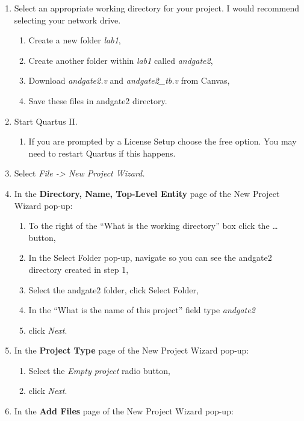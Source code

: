 \begin{enumerate}
\def\labelenumi{\arabic{enumi}.}
\item
  Select an appropriate working directory for your project. I would
  recommend selecting your network drive.

  \begin{enumerate}
  \def\labelenumii{\alph{enumii}.}
  \item
    Create a new folder \emph{lab1},
  \item
    Create another folder within \emph{lab1} called \emph{andgate2},
  \item
    Download \emph{andgate2.v} and \emph{andgate2\_tb.v} from Canvas,
  \item
    Save these files in andgate2 directory.
  \end{enumerate}
\item
  Start Quartus II.

  \begin{enumerate}
  \def\labelenumii{\alph{enumii}.}
  \item
    If you are prompted by a License Setup choose the free option. You
    may need to restart Quartus if this happens.
  \end{enumerate}
\item
  Select \emph{File -\textgreater{} New Project Wizard.}
\item
  In the \textbf{Directory, Name, Top-Level Entity} page of the New
  Project Wizard pop-up:

  \begin{enumerate}
  \def\labelenumii{\alph{enumii}.}
  \item
    To the right of the ``What is the working directory'' box click the
    \ldots{} button,
  \item
    In the Select Folder pop-up, navigate so you can see the andgate2
    directory created in step 1,
  \item
    Select the andgate2 folder, click Select Folder,
  \item
    In the ``What is the name of this project'' field type
    \emph{andgate2}
  \item
    click \emph{Next}.
  \end{enumerate}
\item
  In the \textbf{Project Type} page of the New Project Wizard pop-up:

  \begin{enumerate}
  \def\labelenumii{\alph{enumii}.}
  \item
    Select the \emph{Empty project} radio button,
  \item
    click \emph{Next}.
  \end{enumerate}
\item
  In the \textbf{Add Files} page of the New Project Wizard pop-up:


\end{enumerate}

